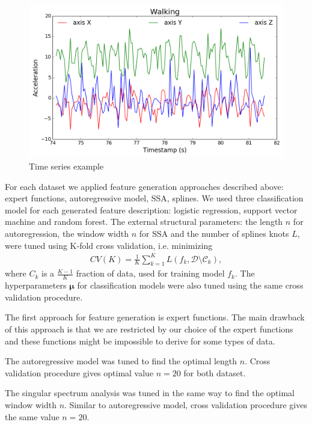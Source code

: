 \documentclass{llncs}
\begin{document}
\begin{figure}[h]
	\centering
	\includegraphics[width=1\linewidth]{ts_example.png}
	\caption{Time series example}
	\label{fig::ts_example}
\end{figure}

For each dataset we applied feature generation approaches described above: expert functions, autoregressive model, SSA, splines. 
We used three classification model for each generated feature description: logistic regression, support vector machine and random forest. 
The external structural parameters: the length $n$ for autoregression, the window width $n$ for SSA and the number of splines knots $L$, were tuned using K-fold cross validation, i.e. minimizing
\begin{align}\label{cv}
CV(K) = \frac{1}{K}\sum_{k=1}^{K} L(f_k, \mathcal{D}\setminus \mathcal{C}_k),
\end{align}
where $C_k$ is a $\frac{K-1}{K}$ fraction of data, used for training model $f_k$.
The hyperparameters $\bm{\mu}$ for classification models were also tuned using the same cross validation procedure. 


The first approach for feature generation is expert functions. The main drawback of this approach is that we are restricted by our choice of the expert functions and these functions might be impossible to derive for some types of data.

The autoregressive model was tuned to find the optimal length $n$. Cross validation procedure gives optimal value $n=20$ for both dataset. 

The singular spectrum analysis was tuned in the same way to find the optimal window width $n$. Similar to autoregressive model, cross validation procedure gives the same value $n=20$.
\end{document}
